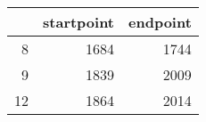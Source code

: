 % 
\begin{tabular}{rrr}
  \hline
 & startpoint & endpoint \\ 
  \hline
8 & 1684 & 1744 \\ 
  9 & 1839 & 2009 \\ 
  12 & 1864 & 2014 \\ 
   \hline
\end{tabular}
